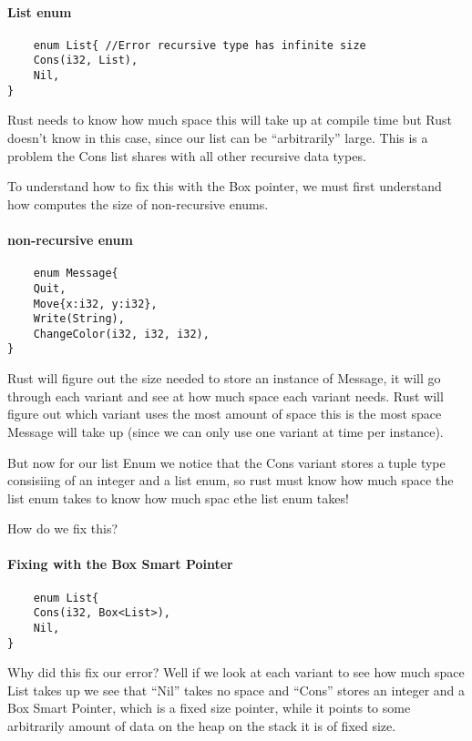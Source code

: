 \paragraph*{List enum}\begin{lstlisting}
    enum List{ //Error recursive type has infinite size
    Cons(i32, List),
    Nil,
} 
\end{lstlisting}
Rust needs to know how much space this will take up at compile time but Rust doesn't know in this case, since our list can be ``arbitrarily'' large. This is a problem the Cons list shares with all other recursive data types.


To understand how to fix this with the Box pointer, we must first understand how computes the size of non-recursive enums.

\paragraph*{non-recursive enum}\begin{lstlisting}
    enum Message{
    Quit,
    Move{x:i32, y:i32},
    Write(String),
    ChangeColor(i32, i32, i32),
}
\end{lstlisting}
Rust will figure out the size needed to store an instance of Message, it will go through each variant and see at how much space each variant needs. Rust will figure out which variant uses the most amount of space this is the most space Message will take up (since we can only use one variant at time per instance).

But now for our list Enum we notice that the Cons variant stores a tuple type consisiing of an integer and a list enum, so rust must know how much space the list enum takes to know how much spac ethe list enum takes! 

How do we fix this?

\paragraph*{Fixing with the Box Smart Pointer}\begin{lstlisting}
    enum List{
    Cons(i32, Box<List>),
    Nil,
}
\end{lstlisting}
Why did this fix our error? Well if we look at each variant to see how much space List takes up we see that ``Nil'' takes no space and ``Cons'' stores an integer and a Box Smart Pointer, which is a fixed size pointer, while it points to some arbitrarily amount of data on the heap on the stack it is of fixed size. 


